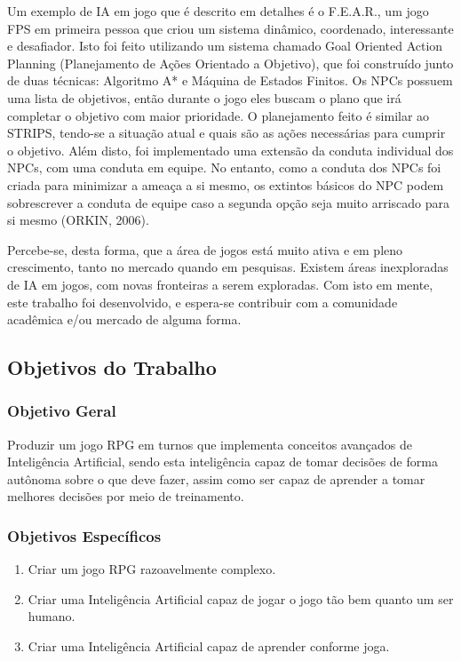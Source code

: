 \documentclass[12pt,a4paper]{article}
\begin{document}
	Um exemplo de IA em jogo que é descrito em detalhes é o F.E.A.R.,
	um jogo FPS em primeira pessoa
	que criou um sistema dinâmico, coordenado, interessante e desafiador.
	Isto foi feito utilizando um sistema chamado Goal Oriented Action Planning (Planejamento de Ações Orientado a Objetivo),
	que foi construído junto de duas técnicas: Algoritmo A* e Máquina de Estados Finitos.
	Os NPCs possuem uma lista de objetivos,
	então durante o jogo eles buscam o plano que irá completar o objetivo com maior prioridade.
	O planejamento feito é similar ao STRIPS,
	tendo-se a situação atual e quais são as ações necessárias para cumprir o objetivo.
	Além disto, foi implementado uma extensão da conduta individual dos NPCs,
	com uma conduta em equipe.
	No entanto, como a conduta dos NPCs foi criada para minimizar a ameaça a si mesmo,
	os extintos básicos do NPC podem sobrescrever a conduta de equipe
	caso a segunda opção seja muito arriscado para si mesmo (ORKIN, 2006).
	
	Percebe-se, desta forma, que a área de jogos está muito ativa e em pleno crescimento,
	tanto no mercado quando em pesquisas.
	Existem áreas inexploradas de IA em jogos,
	com novas fronteiras a serem exploradas.
	Com isto em mente, este trabalho foi desenvolvido,
	e espera-se contribuir com a comunidade acadêmica e/ou mercado de alguma forma.

	\FloatBarrier
	\subsection{Objetivos do Trabalho}
	
		\FloatBarrier
		\subsubsection{Objetivo Geral}
			Produzir um jogo RPG em turnos que implementa conceitos avançados de Inteligência Artificial,
			sendo esta inteligência capaz de tomar decisões de forma autônoma sobre o que deve fazer,
			assim como ser capaz de aprender a tomar melhores decisões por meio de treinamento.
		
		\FloatBarrier
		\subsubsection{Objetivos Específicos}
			\begin{enumerate}[noitemsep]
				\item Criar um jogo RPG razoavelmente complexo.
				\item Criar uma Inteligência Artificial capaz de jogar o jogo tão bem quanto um ser humano.
				\item Criar uma Inteligência Artificial capaz de aprender conforme joga.
			\end{enumerate}			
	
\end{document}
